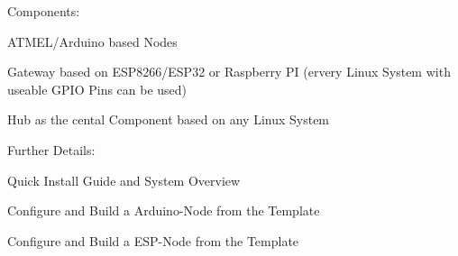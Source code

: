  Components\+:
\begin{DoxyItemize}
\item ATMEL/\+Arduino based Nodes
\item Gateway based on ESP8266/\+ESP32 or Raspberry PI (ervery Linux System with useable GPIO Pins can be used)
\item Hub as the cental Component based on any Linux System
\item Further Details\+:
\item Quick Install Guide and System Overview
\item Configure and Build a Arduino-\/\+Node from the Template
\item Configure and Build a ESP-\/\+Node from the Template 
\end{DoxyItemize}
